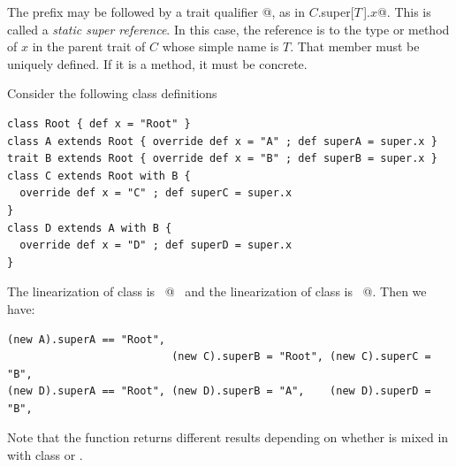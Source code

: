 The  prefix may be followed by a trait qualifier
\lstinline@[$T\,$]@, as in \lstinline@$C$.super[$T\,$].$x$@. This is
called a {\em static super reference}.  In this case, the reference is
to the type or method of $x$ in the parent trait of $C$ whose simple
name is $T$. That member must be uniquely defined. If it is a method,
it must be concrete.

\example\label{ex:super}
Consider the following class definitions

\begin{lstlisting}
class Root { def x = "Root" }
class A extends Root { override def x = "A" ; def superA = super.x }
trait B extends Root { override def x = "B" ; def superB = super.x }
class C extends Root with B { 
  override def x = "C" ; def superC = super.x
}
class D extends A with B {
  override def x = "D" ; def superD = super.x
}
\end{lstlisting}
The linearization of class  is ~@~ and
the linearization of class  is ~@.
Then we have:
\begin{lstlisting}
(new A).superA == "Root", 
                          (new C).superB = "Root", (new C).superC = "B",
(new D).superA == "Root", (new D).superB = "A",    (new D).superD = "B",
\end{lstlisting}
Note that the  function returns different results
depending on whether  is mixed in with class  or .



